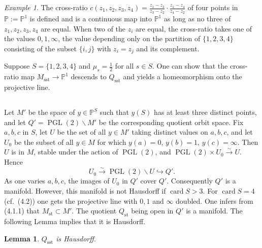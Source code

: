 \documentclass[12pt,a4paper]{article}
\theoremstyle{plain}
\newtheorem{lemma}[theorem]{Lemma}
\theoremstyle{definition}
\theoremstyle{remark}
\newtheorem{example}[theorem]{Example}
\DeclareMathOperator{\card}{card}
\DeclareMathOperator{\PGL}{PGL}
\newcommand{\PP}{\mathbb{P}}
\numberwithin{equation}{section}
\providecommand{\PP}{\mathbb{P}}
\providecommand{\PGL}{\operatorname{PGL}}
\begin{document}
\begin{example}\label{ex:4.2}
The cross-ratio $c(z_1, z_2, z_3, z_4) = \frac{z_1 - z_3}{z_3 - z_2} \cdot \frac{z_1 - z_4}{z_4 - z_2}$ of four points in $\PP := \PP^1$ is defined and is a continuous map into $\PP^1$ as long as no three of $z_1, z_2, z_3, z_4$ are equal. When two of the $z_i$ are equal, the cross-ratio takes one of the values $0, 1, \infty$, the value depending only on the partition of $\{1, 2, 3, 4\}$ consisting of the subset $\{i, j\}$ with $z_i = z_j$ and its complement.

Suppose $S = \{1, 2, 3, 4\}$ and $\mu_s = \frac{1}{2}$ for all $s \in S$. One can show that the cross-ratio map $M_{\mathrm{sst}} \to \PP^1$ descends to $Q_{\mathrm{sst}}$ and yields a homeomorphism onto the projective line.
\end{example}

\subsection{}
Let $M'$ be the space of $y \in \PP^S$ such that $y(S)$ has at least three distinct points, and let $Q' = \PGL(2) \backslash M'$ be the corresponding quotient orbit space. Fix $a, b, c$ in $S$, let $U$ be the set of all $y \in M'$ taking distinct values on $a, b, c$, and let $U_0$ be the subset of all $y \in M$ for which $y(a) = 0$, $y(b) = 1$, $y(c) = \infty$. Then $U$ is in $M$, stable under the action of $\PGL(2)$, and $\PGL(2) \times U_0 \xrightarrow{\sim} U$. Hence
\[
U_0 \xrightarrow{\sim} \PGL(2) \backslash U \hookrightarrow Q'.
\]
As one varies $a, b, c$, the images of $U_0$ in $Q'$ cover $Q'$. Consequently $Q'$ is a manifold. However, this manifold is not Hausdorff if $\card S > 3$. For $\card S = 4$ (cf.\ (4.2)) one gets the projective line with $0, 1$ and $\infty$ doubled. One infers from (4.1.1) that $M_{\mathrm{st}} \subset M'$. The quotient $Q_{\mathrm{st}}$ being open in $Q'$ is a manifold. The following Lemma implies that it is Hausdorff.

\begin{lemma}\label{lem:4.3}
$Q_{\mathrm{sst}}$ is Hausdorff.
\end{lemma}
\end{document}
